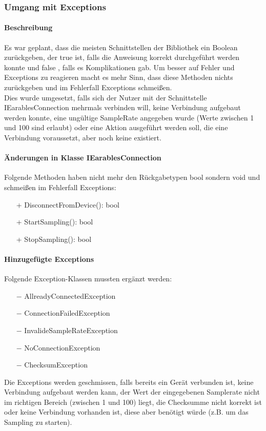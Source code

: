 \documentclass[a4paper,12pt]{article}
\begin{document}
\subsubsection{Umgang mit Exceptions}
\paragraph{Beschreibung}
Es war geplant, dass die meisten Schnittstellen der Bibliothek ein Boolean zurückgeben, der true ist, falls die Anweisung korrekt durchgeführt werden konnte und false , falls es Komplikationen gab.
Um besser auf Fehler und Exceptions zu reagieren macht es mehr Sinn, dass diese Methoden nichts zurückgeben und im Fehlerfall Exceptions schmeißen.\\
Dies wurde umgesetzt, falls sich der Nutzer mit der Schnittstelle IEarablesConnection mehrmals verbinden will, keine Verbindung aufgebaut werden konnte, eine ungültige SampleRate angegeben wurde (Werte zwischen 1 und 100 sind erlaubt) oder eine Aktion ausgeführt werden soll, die eine Verbindung voraussetzt, aber noch keine existiert.

\paragraph{Änderungen in Klasse IEarablesConnection}
Folgende Methoden haben nicht mehr den Rückgabetypen bool sondern void und schmeißen im Fehlerfall Exceptions:
\begin{itemize}
	\item[+] DisconnectFromDevice(): bool
	\item[+] StartSampling(): bool
	\item[+] StopSampling(): bool
\end{itemize} 
\paragraph{Hinzugefügte Exceptions}
Folgende Exception-Klassen mussten ergänzt werden:
\begin{itemize}
	\item[$-$] AllreadyConnectedException
	\item[$-$] ConnectionFailedException
	\item[$-$] InvalideSampleRateException
	\item[$-$] NoConnectionException
	\item[$-$] ChecksumException %
\end{itemize}
Die Exceptions werden geschmissen, falls bereits ein Gerät verbunden ist, keine Verbindung aufgebaut werden kann, der Wert der eingegebenen Samplerate nicht im richtigen Bereich (zwischen 1 und 100) liegt, die Checksumme nicht korrekt ist oder keine Verbindung vorhanden ist, diese aber benötigt würde (z.B. um das Sampling zu starten).
\end{document}
